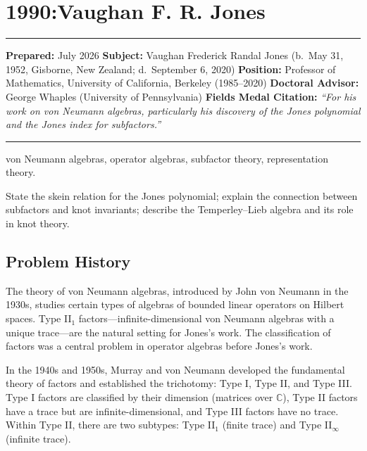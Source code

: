 \chapter{1990:Vaughan F. R. Jones}\label{ch1990vaughanjones:vaughan-f.-r.-jones-fields-medal-1990-a-comprehensive-report}

\begin{center}\rule{0.5\linewidth}{0.5pt}\end{center}

\textbf{Prepared:} July 2026 \textbf{Subject:} Vaughan Frederick Randal Jones (b.~May 31, 1952, Gisborne, New Zealand; d.~September 6, 2020) \textbf{Position:} Professor of Mathematics, University of California, Berkeley (1985--2020) \textbf{Doctoral Advisor:} George Whaples (University of Pennsylvania) \textbf{Fields Medal Citation:} \emph{``For his work on von Neumann algebras, particularly his discovery of the Jones polynomial and the Jones index for subfactors.''}

\begin{center}\rule{0.5\linewidth}{0.5pt}\end{center}

\begin{prereqs} von Neumann algebras, operator algebras, subfactor theory, representation theory. \end{prereqs}

\begin{objectives} State the skein relation for the Jones polynomial; explain the connection between subfactors and knot invariants; describe the Temperley--Lieb algebra and its role in knot theory. \end{objectives}

\section{Problem History}

The theory of von Neumann algebras, introduced by John von Neumann in the 1930s, studies certain types of algebras of bounded linear operators on Hilbert spaces. Type II$_1$ factors---infinite-dimensional von Neumann algebras with a unique trace---are the natural setting for Jones's work. The classification of factors was a central problem in operator algebras before Jones's work.

In the 1940s and 1950s, Murray and von Neumann developed the fundamental theory of factors and established the trichotomy: Type I, Type II, and Type III. Type I factors are classified by their dimension (matrices over $\mathbb{C}$), Type II factors have a trace but are infinite-dimensional, and Type III factors have no trace. Within Type II, there are two subtypes: Type II$_1$ (finite trace) and Type II$_\infty$ (infinite trace).

